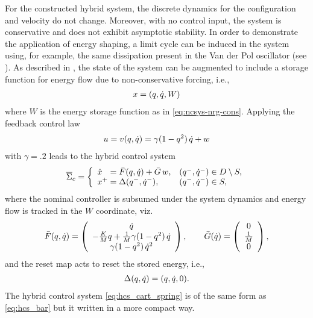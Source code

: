 For the constructed hybrid system, the discrete dynamics for the configuration
and velocity do not change.
%
Moreover, with no control input, the system is conservative and does not exhibit
asymptotic stability.
%
In order to demonstrate the application of energy shaping, a limit cycle can be
induced in the system using, for example, the same dissipation present in the
Van der Pol oscillator (see \cite[pp.~13]{Khalil2002}).
%
As described in , the state of the system can be
augmented to include a storage function for energy flow due to non-conservative
forcing, i.e.,
\begin{align*}
  x = (q, \dot{q}, W)
\end{align*}
where $W$ is the energy storage function as in \eqref{eq:ncsys-nrg-cons}.
%
Applying the feedback control law
\begin{align}
  \label{eq:spring_cart_vdp_controller}
  u = v(q, \dot{q}) = \gamma(1 - q^{2}) \, \dot{q} + w
\end{align}
with $\gamma = .2$ leads to the hybrid control system
\begin{align}
  \label{eq:hcs_cart_spring}
  {\overline {\Sigma}}_{c} = \left\{
  \begin{array}{l l}
    {\dot {x}}\hphantom{^+} = {\bar {F}}(q, \dot{q}) + {\bar {G}} \, w, & (q^{-}, \dot{q}^{-}) \in D \setminus S,\\
    x^{+} = \Delta(q^{-}, \dot{q}^{-}), & (q^{-}, \dot{q}^{-}) \in S,
  \end{array}\right.
\end{align}
where the nominal controller is subsumed under the system dynamics and energy
flow is tracked in the $W$ coordinate, viz.
\begin{align*}
  {\bar {F}}(q, \dot{q}) = \left(\begin{array}{c}
      \dot{q}\\
      -\frac{K}{M} q + \frac{1}{M} \gamma(1 - q^{2}) \, \dot{q}\\
      \gamma(1 - q^{2}) \, \dot{q}^{2}
    \end{array}\right), \qquad
  {\bar {G}}(\dot{q}) = \left(\begin{array}{c}
      0\\
      \frac{1}{M}\\
      0
    \end{array}\right),
\end{align*}
and the reset map acts to reset the stored energy, i.e.,
\begin{align*}
  \Delta(q, \dot{q}) = (q, \dot{q}, 0).
\end{align*}
%
The hybrid control system \eqref{eq:hcs_cart_spring} is of the same form as
\eqref{eq:hcs_bar} but it written in a more compact way.


